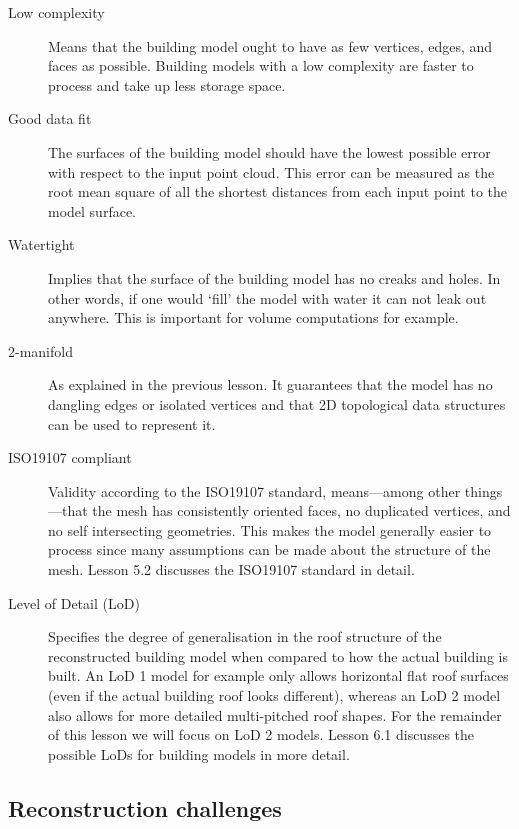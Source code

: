 \begin{description}
	\item[Low complexity] Means that the building model ought to have as few vertices, edges, and faces as possible. Building models with a low complexity are faster to process and take up less storage space.
	\item[Good data fit] The surfaces of the building model should have the lowest possible error with respect to the input point cloud. This error can be measured as the root mean square of all the shortest distances from each input point to the model surface. 
	\item[Watertight] Implies that the surface of the building model has no creaks and holes. In other words, if one would `fill' the model with water it can not leak out anywhere. This is important for volume computations for example. 
	\item[2-manifold] As explained in the previous lesson. It guarantees that the model has no dangling edges or isolated vertices and that 2D topological data structures can be used to represent it.
	\item[ISO19107 compliant] Validity according to the ISO19107 standard, means---among other things---that the mesh has consistently oriented faces, no duplicated vertices, and no self intersecting geometries. This makes the model generally easier to process since many assumptions can be made about the structure of the mesh. Lesson 5.2 discusses the ISO19107 standard in detail.
	\item[Level of Detail (LoD)] Specifies the degree of generalisation in the roof structure of the reconstructed building model when compared to how the actual building is built. An LoD 1 model for example only allows horizontal flat roof surfaces (even if the actual building roof looks different), whereas an LoD 2 model also allows for more detailed multi-pitched roof shapes. For the remainder of this lesson we will focus on LoD 2 models. Lesson 6.1 discusses the possible LoDs for building models in more detail.
\end{description}

\subsection{Reconstruction challenges}

